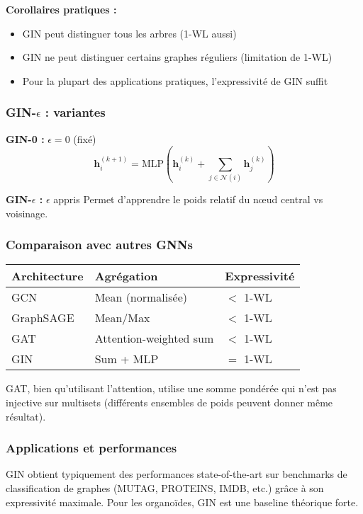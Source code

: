\textbf{Corollaires pratiques :}
\begin{itemize}
    \item GIN peut distinguer tous les arbres (1-WL aussi)
    \item GIN ne peut distinguer certains graphes réguliers (limitation de 1-WL)
    \item Pour la plupart des applications pratiques, l'expressivité de GIN suffit
\end{itemize}

\subsubsection{GIN-$\epsilon$ : variantes}

\textbf{GIN-0 :} $\epsilon = 0$ (fixé)
\[
\mathbf{h}_i^{(k+1)} = \text{MLP}\left(\mathbf{h}_i^{(k)} + \sum_{j \in \mathcal{N}(i)} \mathbf{h}_j^{(k)}\right)
\]

\textbf{GIN-$\epsilon$ :} $\epsilon$ appris
Permet d'apprendre le poids relatif du nœud central vs voisinage.

\subsubsection{Comparaison avec autres GNNs}

\begin{table}[h]
\centering
\begin{tabular}{lll}
\hline
\textbf{Architecture} & \textbf{Agrégation} & \textbf{Expressivité} \\
\hline
GCN & Mean (normalisée) & $<$ 1-WL \\
GraphSAGE & Mean/Max & $<$ 1-WL \\
GAT & Attention-weighted sum & $<$ 1-WL \\
GIN & Sum + MLP & $=$ 1-WL \\
\hline
\end{tabular}
\end{table}

GAT, bien qu'utilisant l'attention, utilise une somme pondérée qui n'est pas injective sur multisets (différents ensembles de poids peuvent donner même résultat).

\subsubsection{Applications et performances}

GIN obtient typiquement des performances state-of-the-art sur benchmarks de classification de graphes (MUTAG, PROTEINS, IMDB, etc.) grâce à son expressivité maximale. Pour les organoïdes, GIN est une baseline théorique forte.

